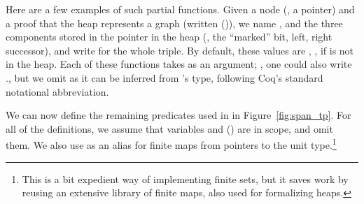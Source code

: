 Here are a few examples of such partial functions. Given a node (\ie,
a pointer)  and a proof that the heap  represents a
graph (written ()), we name ,
 and  the three components stored in the
pointer  in the heap (\ie, the ``marked'' bit, left, right
successor), and write  for the whole triple.  By
default, these values are , ,  if
 is not in the heap.
%
Each of these functions takes  as an argument; \ie, one could
also write  \etc., but we omit  as it can be
inferred from 's type, following Coq's standard notational
abbreviation.

We can now define the remaining predicates used in  in
Figure~\ref{fig:span_tp}. For all of the definitions, we assume that variables
 and () are in scope, and omit them. We also use
 as an alias for finite maps from pointers to the unit
type.\footnote{This is a bit expedient way of implementing finite
  sets, but it saves work by reusing an extensive library of finite
  maps, also used for formalizing heaps.}

